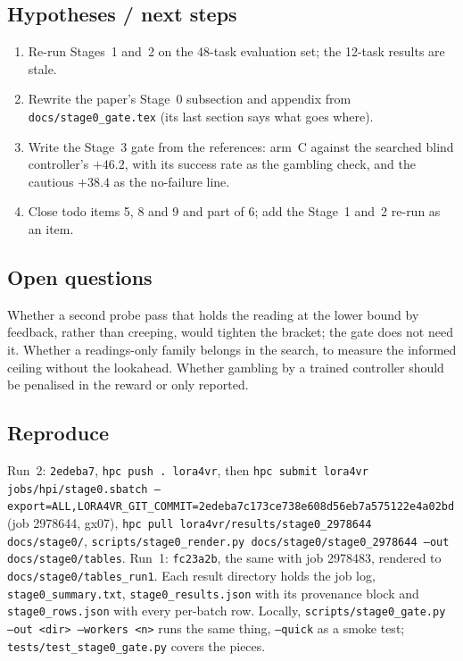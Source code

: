 \documentclass[11pt,a4paper]{article}
\newcommand{\commit}[1]{\texttt{\textcolor{commitgray}{#1}}}
\begin{document}
\subsection*{Hypotheses / next steps}

\begin{enumerate}[nosep]
\item Re-run Stages~1 and~2 on the 48-task evaluation set; the 12-task
  results are stale.
\item Rewrite the paper's Stage~0 subsection and appendix from
  \texttt{docs/stage0\_gate.tex} (its last section says what goes where).
\item Write the Stage~3 gate from the references: arm~C against the searched
  blind controller's $+46.2$, with its success rate as the gambling check,
  and the cautious $+38.4$ as the no-failure line.
\item Close todo items 5, 8 and 9 and part of 6; add the Stage~1 and~2
  re-run as an item.
\end{enumerate}

\subsection*{Open questions}

Whether a second probe pass that holds the reading at the lower bound by
feedback, rather than creeping, would tighten the bracket; the gate does not
need it. Whether a readings-only family belongs in the search, to measure the
informed ceiling without the lookahead. Whether gambling by a trained
controller should be penalised in the reward or only reported.

\subsection*{Reproduce}

\begin{sloppypar}
Run~2: \commit{2edeba7}, \texttt{hpc push . lora4vr}, then
\texttt{hpc submit lora4vr jobs/hpi/stage0.sbatch
--export=ALL,LORA4VR\_GIT\_COMMIT=2edeba7c173ce738e608d56eb7a575122e4a02bd}
(job 2978644, gx07), \texttt{hpc pull lora4vr/results/stage0\_2978644
docs/stage0/}, \texttt{scripts/stage0\_render.py docs/stage0/stage0\_2978644
--out docs/stage0/tables}. Run~1: \commit{fc23a2b}, the same with job
2978483, rendered to \texttt{docs/stage0/tables\_run1}. Each result directory
holds the job log, \texttt{stage0\_summary.txt}, \texttt{stage0\_results.json}
with its provenance block and \texttt{stage0\_rows.json} with every per-batch
row. Locally, \texttt{scripts/stage0\_gate.py --out <dir> --workers <n>} runs
the same thing, \texttt{--quick} as a smoke test; \texttt{tests/test\_stage0\_gate.py}
covers the pieces.
\end{sloppypar}
\end{document}
